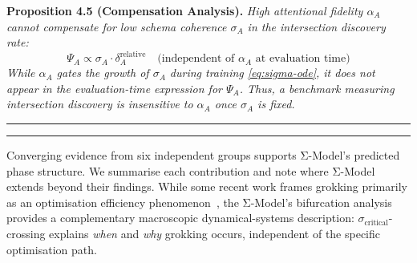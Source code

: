 \textbf{Proposition 4.5 (Compensation Analysis).} %
\textit{High attentional fidelity $\alpha_A$ cannot compensate for low
schema coherence $\sigma_A$ in the intersection discovery rate:
\begin{equation}\label{eq:no-compensation}
\Psi_A \propto \sigma_A \cdot \delta_A^{\text{relative}} \quad \text{(independent of } \alpha_A \text{ at evaluation time)}
\end{equation}
While $\alpha_A$ gates the \textit{growth} of $\sigma_A$ during training
\eqref{eq:sigma-ode}, it does not appear in the evaluation-time
expression for $\Psi_A$. Thus, a benchmark measuring intersection discovery
is insensitive to $\alpha_A$ once $\sigma_A$ is fixed.}

\noindent\rule{\linewidth}{0.4pt}



\noindent\rule{\linewidth}{0.4pt}

Converging evidence from six independent groups supports Σ-Model's predicted phase structure. We summarise each contribution and note where Σ-Model extends beyond their findings. While some recent work frames grokking primarily as an optimisation efficiency phenomenon~\citep{liu2022grokking}, the Σ-Model's bifurcation analysis provides a complementary macroscopic dynamical-systems description: $\sigma_{\text{critical}}$-crossing explains \emph{when} and \emph{why} grokking occurs, independent of the specific optimisation path.

